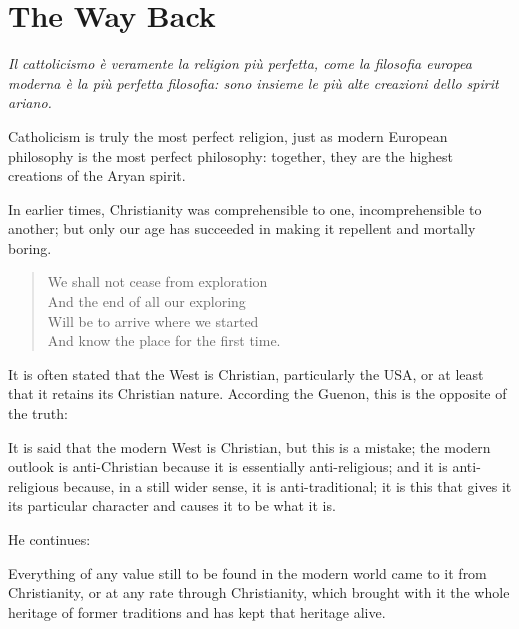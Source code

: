 \section{The Way Back}

\begin{quotex}
\textit{Il cattolicismo è veramente la religion più perfetta, come la filosofia europea moderna è la più perfetta filosofia: sono insieme le più alte creazioni dello spirit ariano.}

Catholicism is truly the most perfect religion, just as modern European philosophy is the most perfect philosophy: together, they are the highest creations of the Aryan spirit.



In earlier times, Christianity was comprehensible to one, incomprehensible to another; but only our age has succeeded in making it repellent and mortally boring.


\begin{verse}
We shall not cease from exploration\\
And the end of all our exploring\\
Will be to arrive where we started\\
And know the place for the first time.
\end{verse}

\end{quotex}


It is often stated that the West is Christian, particularly the USA, or at least that it retains its Christian nature. According the Guenon, this is the opposite of the truth:

\begin{quotex}
It is said that the modern West is Christian, but this is a mistake; the modern outlook is anti-Christian because it is essentially anti-religious; and it is anti-religious because, in a still wider sense, it is anti-traditional; it is this that gives it its particular character and causes it to be what it is.
\end{quotex}


He continues:

\begin{quotex}
Everything of any value still to be found in the modern world came to it from Christianity, or at any rate through Christianity, which brought with it the whole heritage of former traditions and has kept that heritage alive.
\end{quotex}


